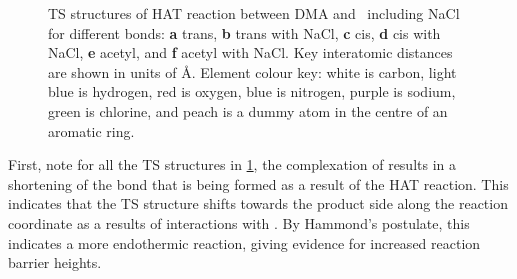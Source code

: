 \begin{figure}[!htbp]\ContinuedFloat
  \setcounter{subfigure}{4}

  \caption[TS structures of HAT reaction between DMA and \cumo\ including and
  excluding NaCl.]{TS structures of HAT reaction between DMA and \cumo\
  including NaCl for different  bonds: \textbf{a} trans, \textbf{b}
  trans with NaCl, \textbf{c} cis, \textbf{d} cis with NaCl, \textbf{e} acetyl,
  and \textbf{f} acetyl with NaCl. Key interatomic distances are shown in units
  of \AA. Element colour key: white is carbon, light blue is hydrogen, red is
  oxygen, blue is nitrogen, purple is sodium, green is chlorine, and peach is a
  dummy atom in the centre of an aromatic ring.}
  \label{fig:dma-cumo-ts}
\end{figure}

First, note for all the TS structures in \ref{fig:dma-cumo-ts}, the complexation
of \ch{NaCl} results in a shortening of the \ch{O-H} bond that is being formed
as a result of the HAT reaction. This indicates that the TS structure shifts
towards the product side along the reaction coordinate as a results of
interactions with \ch{NaCl}. By Hammond's postulate,\cite{Hammond1955} this
indicates a more endothermic reaction, giving evidence for increased reaction
barrier heights.

